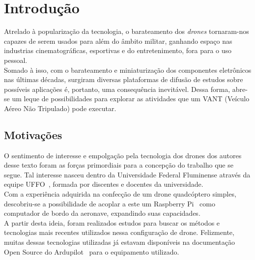 \documentclass[12pt,a4paper,oneside]{book}
\begin{document}
\clearpage



%




\chapter{Introdução}
%
\thispagestyle{empty} 
%
%
Atrelado à popularização da tecnologia, o barateamento dos \textit{drones} tornaram-nos capazes de serem usados para além do âmbito militar, 
ganhando espaço nas industrias cinematográficas, esportivas e do entretenimento, fora para o uso pessoal.\\
Somado à isso, com o barateamento e miniaturização dos componentes eletrônicos nas últimas décadas, surgiram diversas plataformas de 
difusão de estudos sobre possíveis aplicações é, portanto, uma consequência inevitável. Dessa forma, abre-se um leque de possibilidades 
para explorar as atividades que um VANT (Veículo Aéreo Não Tripulado) pode executar.\\



\section{Motivações}

O sentimento de interesse e empolgação pela tecnologia dos drones dos autores desse texto foram as forças primordiais para a concepção 
do trabalho que se segue. Tal interesse nasceu dentro da Universidade Federal Fluminense através da equipe UFFO~\cite{url:equipeuffo}, 
formada por discentes e docentes da universidade.\\
Com a experiência adquirida na confecção de um drone quadcóptero simples, descobriu-se a possibilidade de acoplar a este um 
Raspberry Pi~\cite{url:raspberrypi} como computador de bordo da aeronave, expandindo suas capacidades.\\
A partir desta ideia, foram realizados estudos para buscar os métodos e tecnologias mais recentes utilizados nessa configuração de drone. 
Felizmente, muitas dessas tecnologias utilizadas já estavam disponíveis na documentação Open Source do Ardupilot~\cite{url:ardupilotdoc} 
para o equipamento utilizado.
\end{document}
